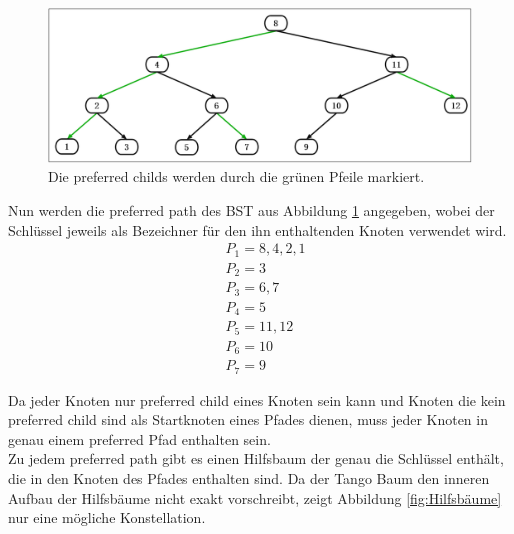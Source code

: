 \documentclass[a4paper,12pt]{article}
\begin{document}
\begin{figure}[H]
	\centering
	\includegraphics[width=1\textwidth]{"Medien/Tango/prefChilds"}
	\caption{Die preferred childs werden durch die grünen Pfeile markiert. }
	\label{fig:prefChilds}
\end{figure}

\noindent Nun werden die preferred path des BST aus Abbildung \ref{fig:prefChilds} angegeben, wobei der Schlüssel jeweils als Bezeichner für den ihn enthaltenden Knoten verwendet wird.
\begin{align*}
&P_1 = 8, 4, 2,1 \\
&P_2 = 3 \\
&P_3 = 6, 7 \\
&P_4 = 5 \\
&P_5 = 11, 12 \\
&P_6 = 10 \\
&P_7 = 9
\end{align*}

\noindent Da jeder Knoten nur preferred child eines Knoten sein kann und Knoten die kein preferred child sind als Startknoten eines Pfades dienen, muss jeder Knoten in genau einem preferred Pfad enthalten sein.\\
Zu jedem preferred path gibt es einen Hilfsbaum der genau die Schlüssel enthält, die in den Knoten des Pfades enthalten sind. Da der Tango Baum den inneren Aufbau der Hilfsbäume nicht exakt vorschreibt, zeigt Abbildung \ref{fig:Hilfsbäume} nur eine mögliche Konstellation.
\end{document}
